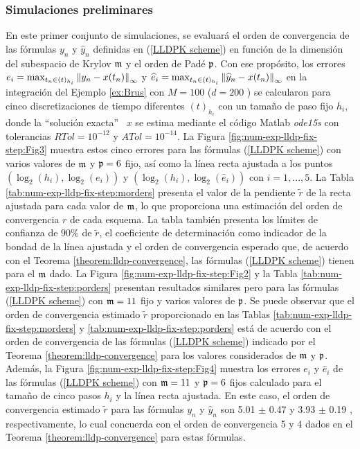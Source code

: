 \subsubsection{Simulaciones preliminares}
En este primer conjunto de simulaciones, se evaluará el orden de convergencia de las fórmulas $y_n$ y $\widehat{y}_n$ definidas en (\ref{LLDPK scheme}) en función de la dimensión del subespacio de Krylov $\mathfrak{m}$ y el orden de Padé $\mathfrak{p}$. Con ese propósito, los errores $e_i=\max_{t_n\in(t)_{h_i}}\left\lVert y_n-x(t_n) \right\rVert_\infty$ y $\widehat{e}_i=\max_{t_n\in(t )_{h_i}}\left\lVert \widehat{y}_n-x(t_n) \right\rVert_\infty$ en la integración del Ejemplo \ref{ex:Brus} con $M=100$ ($d=200$ ) se calcularon para cinco discretizaciones de tiempo diferentes $(t)_{h_i}$ con un tamaño de paso fijo $h_i$, donde la \textquotedblleft solución exacta\textquotedblright~ $x$ se estima mediante el código Matlab \textit{ode15s} con tolerancias $RTol=10^{ -12}$ y $ATol=10^{-14}$. La Figura \ref{fig:num-exp-lldp-fix-step:Fig3} muestra estos cinco errores para las fórmulas (\ref{LLDPK scheme}) con varios valores de $\mathfrak{m}$ y $\mathfrak{p}=6$ fijo, así como la línea recta ajustada a los puntos $(\log_2( h_i),\log_2(e_i))$ y $(\log_2(h_i),\log_2(\widehat{e}_i))$ con $i=1,...,5$. La Tabla \ref{tab:num-exp-lldp-fix-step:morders} presenta el valor de la pendiente $\widetilde{r}$ de la recta ajustada para cada valor de $\mathfrak{m}$, lo que proporciona una estimación del orden de convergencia $r$ de cada esquema. La tabla también presenta los límites de confianza de $90\%$ de $\widetilde{r}$, el coeficiente de determinación como indicador de la bondad de la línea ajustada y el orden de convergencia esperado que, de acuerdo con el Teorema \ref{theorem:lldp-convergence}, las fórmulas (\ref{LLDPK scheme}) tienen para el $\mathfrak{m}$ dado. La Figura \ref{fig:num-exp-lldp-fix-step:Fig2} y la Tabla \ref{tab:num-exp-lldp-fix-step:porders} presentan resultados similares pero para las fórmulas (\ref{LLDPK scheme}) con $\mathfrak{m}=11$ fijo y varios valores de $\mathfrak{p}$. Se puede observar que el orden de convergencia estimado $\widetilde{r}$ proporcionado en las Tablas \ref{tab:num-exp-lldp-fix-step:morders} y \ref{tab:num-exp-lldp-fix-step:porders} está de acuerdo con el orden de convergencia de las fórmulas (\ref{LLDPK scheme}) indicado por el Teorema \ref{theorem:lldp-convergence} para los valores considerados de $\mathfrak{m}$ y $\mathfrak{p}$. Además, la Figura \ref{fig:num-exp-lldp-fix-step:Fig4} muestra los errores $e_i$ y $\widehat{e}_i$ de las fórmulas (\ref{LLDPK scheme}) con $\mathfrak{m}=11$ y $\mathfrak{p}=6$ fijos calculado para el tamaño de cinco pasos $h_i$ y la línea recta ajustada. En este caso, el orden de convergencia estimado $\widetilde{r}$ para las fórmulas $y_n$ y $\widehat{y}_n$ son 5.01 $\pm$ 0.47 y 3.93 $\pm$ 0.19 , respectivamente, lo cual concuerda con el orden de convergencia 5 y 4 dados en el Teorema \ref{theorem:lldp-convergence} para estas fórmulas.

